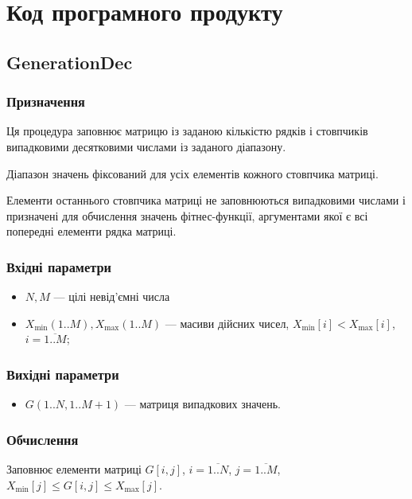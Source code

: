 \documentclass[a4paper, 12pt]{article}
\numberwithin{equation}{section}
\begin{document}
\section{Код програмного продукту}

\subsection{GenerationDec}

\subsubsection{Призначення}

Ця процедура заповнює матрицю із заданою кількістю рядків і стовпчиків випадковими десятковими числами із заданого діапазону. \medskip

Діапазон значень фіксований для усіх елементів кожного стовпчика матриці. \medskip

Елементи останнього стовпчика матриці не заповнюються випадковими числами і призначені для обчислення значень фітнес-функції, аргументами якої є всі попередні елементи рядка матриці.

\subsubsection{Вхідні параметри}

\begin{itemize}
    \item $N, M$ --- цілі невід'ємні числа
    \item $X_{\text{min}}(1..M), X_{\text{max}}(1..M)$ --- масиви дійсних чисел, $X_{\text{min}}[i] < X_{\text{max}}[i]$, $i = \overline{1..M}$;
\end{itemize}

\subsubsection{Вихідні параметри}

\begin{itemize}
    \item $G(1..N, 1..M+1)$ --- матриця випадкових значень.
\end{itemize}

\subsubsection{Обчислення}

Заповнює елементи матриці $G[i,j]$, $i = \overline{1..N}$, $j = \overline{1..M}$, $X_{\text{min}}[j] \le G[i, j] \le X_{\text{max}}[j]$.
\end{document}

